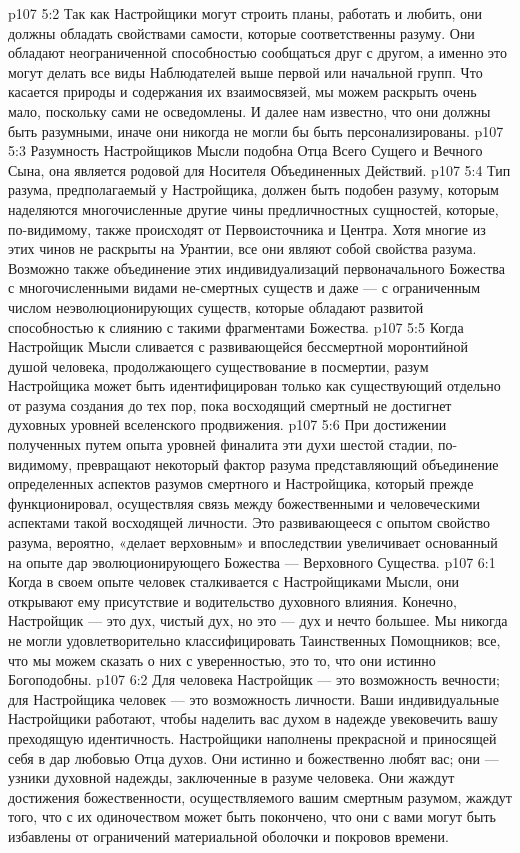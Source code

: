 \vs p107 5:2 Так как Настройщики могут строить планы, работать и любить, они должны обладать свойствами самости, которые соответственны разуму. Они обладают неограниченной способностью сообщаться друг с другом, а именно это могут делать все виды Наблюдателей выше первой или начальной групп. Что касается природы и содержания их взаимосвязей, мы можем раскрыть очень мало, поскольку сами не осведомлены. И далее нам известно, что они должны быть разумными, иначе они никогда не могли бы быть персонализированы.
\vs p107 5:3 Разумность Настройщиков Мысли подобна  Отца Всего Сущего и Вечного Сына, она является родовой для  Носителя Объединенных Действий.
\vs p107 5:4 Тип разума, предполагаемый у Настройщика, должен быть подобен разуму, которым наделяются многочисленные другие чины предличностных сущностей, которые, по\hyp{}видимому, также происходят от Первоисточника и Центра. Хотя многие из этих чинов не раскрыты на Урантии, все они являют собой свойства разума. Возможно также объединение этих индивидуализаций первоначального Божества с многочисленными видами не\hyp{}смертных существ и даже --- с ограниченным числом неэволюционирующих существ, которые обладают развитой способностью к слиянию с такими фрагментами Божества.
\vs p107 5:5 Когда Настройщик Мысли сливается с развивающейся бессмертной моронтийной душой человека, продолжающего существование в посмертии, разум Настройщика может быть идентифицирован только как существующий отдельно от разума создания до тех пор, пока восходящий смертный не достигнет духовных уровней вселенского продвижения.
\vs p107 5:6 При достижении полученных путем опыта уровней финалита эти духи шестой стадии, по\hyp{}видимому, превращают некоторый фактор разума представляющий объединение определенных аспектов разумов смертного и Настройщика, который прежде функционировал, осуществляя связь между божественными и человеческими аспектами такой восходящей личности. Это развивающееся с опытом свойство разума, вероятно, «делает верховным» и впоследствии увеличивает основанный на опыте дар эволюционирующего Божества --- Верховного Существа.
\vs p107 6:1 Когда в своем опыте человек сталкивается с Настройщиками Мысли, они открывают ему присутствие и водительство духовного влияния. Конечно, Настройщик --- это дух, чистый дух, но это --- дух и нечто большее. Мы никогда не могли удовлетворительно классифицировать Таинственных Помощников; все, что мы можем сказать о них с уверенностью, это то, что они истинно Богоподобны.
\vs p107 6:2 Для человека Настройщик --- это возможность вечности; для Настройщика человек --- это возможность личности. Ваши индивидуальные Настройщики работают, чтобы наделить вас духом в надежде увековечить вашу преходящую идентичность. Настройщики наполнены прекрасной и приносящей себя в дар любовью Отца духов. Они истинно и божественно любят вас; они --- узники духовной надежды, заключенные в разуме человека. Они жаждут достижения божественности, осуществляемого вашим смертным разумом, жаждут того, что с их одиночеством может быть покончено, что они с вами могут быть избавлены от ограничений материальной оболочки и покровов времени.
